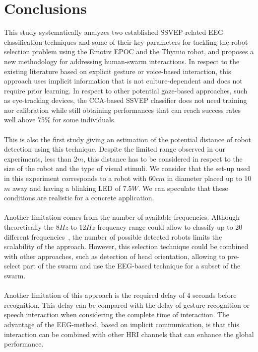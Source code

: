 \documentclass[smallextended]{svjour3}
\begin{document}
\section{Conclusions}
This study systematically analyzes two established SSVEP-related EEG classification techniques and some of their key parameters for tackling the robot selection problem using the Emotiv EPOC and the Thymio robot, and proposes a new methodology for addressing human-swarm interactions. 
In respect to the existing literature based on explicit gesture or voice-based interaction, this approach uses implicit information that is not culture-dependent and does not require prior learning. 
In respect to other potential gaze-based approaches, such as eye-tracking devices, the CCA-based SSVEP classifier does not need training nor calibration while still obtaining performances that can reach success rates well above 75\% for some individuals.\\
\\
This is also the first study giving an estimation of the potential distance of robot detection using this technique.
Despite the limited range observed in our experiments, less than 2$m$, this distance has to be considered in respect to the size of the robot and the type of visual stimuli. We consider that the set-up used in this experiment corresponds to a robot with 60$cm$ in diameter placed up to 10$m$ away and having a blinking LED of 7.5$W$. 
We can speculate that these conditions are realistic for a concrete application.\\
\\
Another limitation comes from the number of available frequencies.
Although theoretically the 8$Hz$ to 12$Hz$ frequency range could allow to classify up to 20 different frequencies~\cite{SSVEPfiability}, the number of possible detected robots limits the scalability of the approach. 
However, this selection technique could be combined with other approaches, such as detection of head orientation, allowing to pre-select part of the swarm and use the EEG-based technique for a subset of the swarm.\\
\\
Another limitation of this approach is the required delay of 4 seconds before recognition. This delay can be compared with the delay of gesture recognition or speech interaction when considering the complete time of interaction. The advantage of the EEG-method, based on implicit communication, is that this interaction can be combined with other HRI channels that can enhance the global performance.\\
\end{document}
